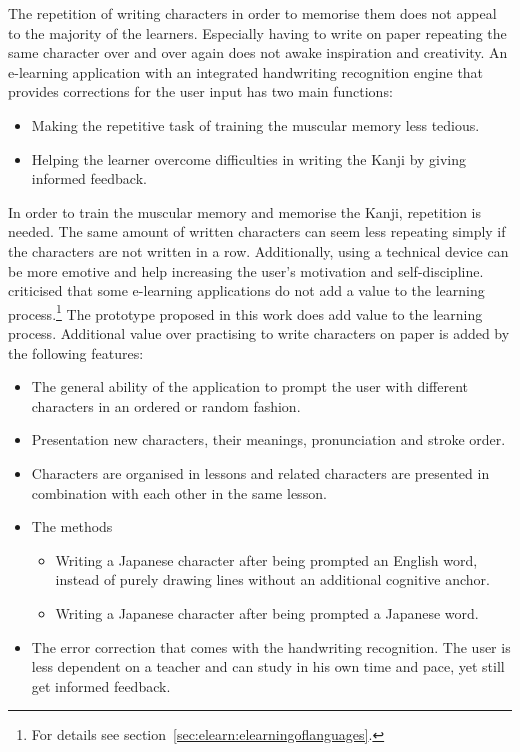 The repetition of writing characters in order to memorise them does not
appeal to the majority of the learners. Especially having to write on paper
repeating the same character over and over again does not awake inspiration
and creativity. An e-learning application with an integrated handwriting 
recognition engine that provides corrections for the user input has two 
main functions:
\begin{itemize}
  \item Making the repetitive task of training the muscular memory less tedious.
  \item Helping the learner overcome difficulties in writing the Kanji by 
        giving informed feedback.
\end{itemize}
In order to train the muscular memory and memorise the Kanji, repetition is 
needed. The same amount of written characters can seem less repeating simply if
the characters are not written in a row. Additionally, using a technical device 
can be more emotive and help increasing the user's motivation and 
self-discipline.  criticised that some 
e-learning applications do not add a value to the learning 
process.\footnote{For details see section~\ref{sec:elearn:elearningoflanguages}.}
The prototype proposed in this work does add value to the learning process.
Additional value over practising to write characters on paper is added
by the following features:
\begin{itemize}
  \item The general ability of the application to prompt the user with 
        different characters in an ordered or random fashion.
  \item Presentation new characters, their meanings, pronunciation and
        stroke order.
  \item Characters are organised in lessons and related characters are presented
        in combination with each other in the same lesson.
  \item The methods
    \begin{itemize}
      \item Writing a Japanese character after being prompted an English word, 
            instead of purely drawing lines without an additional cognitive 
            anchor.
      \item Writing a Japanese character after being prompted a Japanese word.
    \end{itemize}
  \item The error correction that comes with the handwriting recognition. The 
        user is less dependent on a teacher and can study in his own time and 
        pace, yet still get informed feedback.
\end{itemize}
 
